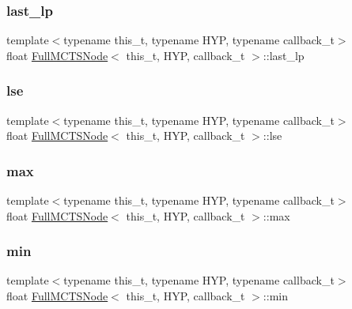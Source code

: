 \subsubsection{\texorpdfstring{last\+\_\+lp}{last\_lp}}
{\footnotesize\ttfamily template$<$typename this\+\_\+t, typename H\+YP, typename callback\+\_\+t$>$ \\
float \hyperlink{class_full_m_c_t_s_node}{Full\+M\+C\+T\+S\+Node}$<$ this\+\_\+t, H\+YP, callback\+\_\+t $>$\+::last\+\_\+lp}

\mbox{\label{class_full_m_c_t_s_node_a9bf1a9e08377dbf41965a94f1d36575a}} 
\subsubsection{\texorpdfstring{lse}{lse}}
{\footnotesize\ttfamily template$<$typename this\+\_\+t, typename H\+YP, typename callback\+\_\+t$>$ \\
float \hyperlink{class_full_m_c_t_s_node}{Full\+M\+C\+T\+S\+Node}$<$ this\+\_\+t, H\+YP, callback\+\_\+t $>$\+::lse}

\mbox{\label{class_full_m_c_t_s_node_ad3d15e6577534461b574f3f6305a1727}} 
\subsubsection{\texorpdfstring{max}{max}}
{\footnotesize\ttfamily template$<$typename this\+\_\+t, typename H\+YP, typename callback\+\_\+t$>$ \\
float \hyperlink{class_full_m_c_t_s_node}{Full\+M\+C\+T\+S\+Node}$<$ this\+\_\+t, H\+YP, callback\+\_\+t $>$\+::max}

\mbox{\label{class_full_m_c_t_s_node_a22e1cc7671e5ed2091ac4623e45f4723}} 
\subsubsection{\texorpdfstring{min}{min}}
{\footnotesize\ttfamily template$<$typename this\+\_\+t, typename H\+YP, typename callback\+\_\+t$>$ \\
float \hyperlink{class_full_m_c_t_s_node}{Full\+M\+C\+T\+S\+Node}$<$ this\+\_\+t, H\+YP, callback\+\_\+t $>$\+::min}

